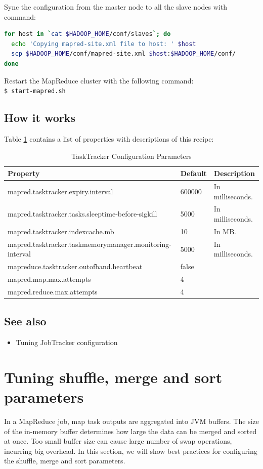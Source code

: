 Sync the configuration from the master node to all the slave nodes with command:
\lstset{style=bashstyle}
\begin{lstlisting}[language=bash]
for host in `cat $HADOOP_HOME/conf/slaves`; do
  echo 'Copying mapred-site.xml file to host: ' $host
  scp $HADOOP_HOME/conf/mapred-site.xml $host:$HADOOP_HOME/conf/
done
\end{lstlisting}

Restart the MapReduce cluster with the following command: \\
\verb|$ start-mapred.sh|

\subsection*{How it works}
Table \ref{tbl:tasktracker} contains a list of properties with descriptions of this recipe:
\begin{table}[ht]
  \centering
  \begin{tabular}{lll}
    \toprule
    \textbf{Property} & \textbf{Default} &  \textbf{Description}  \\ \midrule
      mapred.tasktracker.expiry.interval & 600000 & In milliseconds. \\
      mapred.tasktracker.tasks.sleeptime-before-sigkill & 5000 & In milliseconds. \\
      mapred.tasktracker.indexcache.mb & 10 & In MB. \\
      mapred.tasktracker.taskmemorymanager.monitoring-interval & 5000 & In milliseconds. \\
      mapreduce.tasktracker.outofband.heartbeat & false &  \\
      mapred.map.max.attempts & 4 & \\
      mapred.reduce.max.attempts & 4 &  \\ \bottomrule
  \end{tabular}
  \caption{TaskTracker Configuration Parameters}\label{tbl:tasktracker}
\end{table}

\subsection*{See also}
\begin{itemize}
  \item Tuning JobTracker configuration
\end{itemize}
\section{Tuning shuffle, merge and sort parameters}
In a MapReduce job, map task outputs are aggregated into JVM buffers. The size of the in-memory buffer determines how large the data can be merged and sorted at once. Too small buffer size can cause large number of swap operations, incurring big overhead. In this section, we will show best practices for configuring the shuffle, merge and sort parameters.
